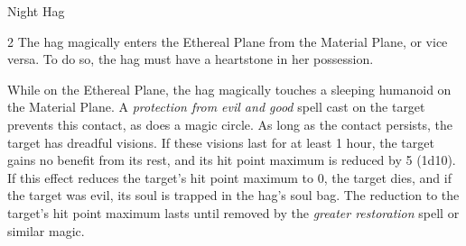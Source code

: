 \documentclass[10pt,a4paper,twoside,bg=print,twocolumn,openany,nodeprecatedcode]{dndbook}
\begin{document}
\begin{DndMonster}[float*=b,width=\textwidth + 8pt]{Night Hag}
\begin{multicols}{2}
The hag magically enters the Ethereal Plane from the Material Plane, or vice versa. To do so, the hag must have a heartstone in her possession.

While on the Ethereal Plane, the hag magically touches a sleeping humanoid on the Material Plane. A \textit{protection from evil and good} spell cast on the target prevents this contact, as does a magic circle. As long as the contact persists, the target has dreadful visions. If these visions last for at least 1 hour, the target gains no benefit from its rest, and its hit point maximum is reduced by 5 (1d10). If this effect reduces the target's hit point maximum to 0, the target dies, and if the target was evil, its soul is trapped in the hag's soul bag. The reduction to the target's hit point maximum lasts until removed by the  \textit{greater restoration} spell or similar magic.

\end{multicols}
\end{DndMonster}
\end{document}
